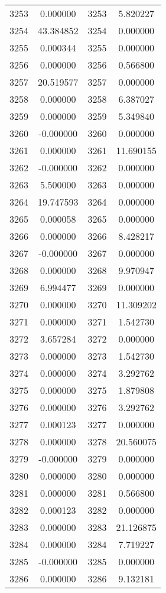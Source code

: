 \documentclass[12pt]{article}
\begin{document}
\begin{longtable}{@{}cccc@{}}
3253 & 0.000000 & 3253 & 5.820227 \\
3254 & 43.384852 & 3254 & 0.000000 \\
3255 & 0.000344 & 3255 & 0.000000 \\
3256 & 0.000000 & 3256 & 0.566800 \\
3257 & 20.519577 & 3257 & 0.000000 \\
3258 & 0.000000 & 3258 & 6.387027 \\
3259 & 0.000000 & 3259 & 5.349840 \\
3260 & -0.000000 & 3260 & 0.000000 \\
3261 & 0.000000 & 3261 & 11.690155 \\
3262 & -0.000000 & 3262 & 0.000000 \\
3263 & 5.500000 & 3263 & 0.000000 \\
3264 & 19.747593 & 3264 & 0.000000 \\
3265 & 0.000058 & 3265 & 0.000000 \\
3266 & 0.000000 & 3266 & 8.428217 \\
3267 & -0.000000 & 3267 & 0.000000 \\
3268 & 0.000000 & 3268 & 9.970947 \\
3269 & 6.994477 & 3269 & 0.000000 \\
3270 & 0.000000 & 3270 & 11.309202 \\
3271 & 0.000000 & 3271 & 1.542730 \\
3272 & 3.657284 & 3272 & 0.000000 \\
3273 & 0.000000 & 3273 & 1.542730 \\
3274 & 0.000000 & 3274 & 3.292762 \\
3275 & 0.000000 & 3275 & 1.879808 \\
3276 & 0.000000 & 3276 & 3.292762 \\
3277 & 0.000123 & 3277 & 0.000000 \\
3278 & 0.000000 & 3278 & 20.560075 \\
3279 & -0.000000 & 3279 & 0.000000 \\
3280 & 0.000000 & 3280 & 0.000000 \\
3281 & 0.000000 & 3281 & 0.566800 \\
3282 & 0.000123 & 3282 & 0.000000 \\
3283 & 0.000000 & 3283 & 21.126875 \\
3284 & 0.000000 & 3284 & 7.719227 \\
3285 & -0.000000 & 3285 & 0.000000 \\
3286 & 0.000000 & 3286 & 9.132181 \\

\end{longtable}
\end{document}
